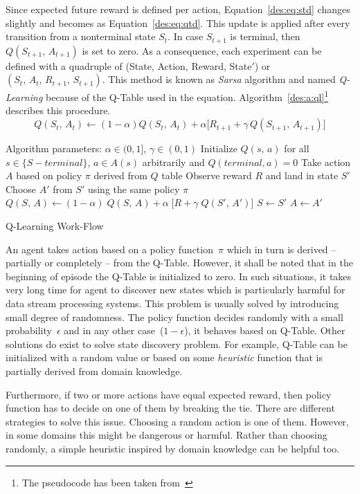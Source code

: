 Since expected future reward is defined per action, Equation~\ref{des:eq:std} changes slightly and becomes as Equation~\ref{des:eq:qtd}. This update is applied after every transition from a nonterminal state $S_t$. In case $S_{t+1}$ is terminal, then $Q(S_{t+1},\,A_{t+1})$ is set to zero. As a consequence, each experiment can be defined with a quadruple of (State, Action, Reward, State$'$) or $(S_{t},\,A_{t},\,R_{t+1},\,S_{t+1})$. This method is known as \emph{Sarsa} algorithm and named \emph{Q-Learning} because of the Q-Table used in the equation. Algorithm~\ref{des:a:ql}\footnote{The pseudocode has been taken from~\textcite{rlIntro}} describes this procedure.
\begin{equation}
Q(S_t,\,A_t) \longleftarrow (1-\alpha)Q(S_t,\,A_t) + \alpha\big[R_{t+1} + \gamma\,Q(S_{t+1},\,A_{t+1})\big]
\label{des:eq:qtd}
\end{equation}
\begin{algorithm}[t]
	\DontPrintSemicolon
	
	Algorithm parameters: $\alpha \in (0,1]$, $\gamma \in (0,1)$\;
	Initialize $Q(s,\,a)$ for all $s \in \{S - terminal\}$, $a \in A(s)$ arbitrarily and $Q(terminal,a) = 0$\;
	\BlankLine
	 {
		Take action $A$ based on policy $\pi$ derived from $Q$ table\;
		Observe reward $R$ and land in state $S'$\;
		Choose $A'$ from $S'$ using the same policy $\pi$\;
		$Q(S,\,A) \gets (1-\alpha)\;Q(S,\,A) + \alpha\;\big[R + \gamma\;Q(S',\,A')\big]$\;
		$S \gets S'$\;
		$A \gets A'$\;
	}
	\caption{Q-Learning Work-Flow}
	\label{des:a:ql}
\end{algorithm}

An agent takes action based on a policy function~$\pi$ which in turn is derived -- partially or completely -- from the Q-Table. However, it shall be noted that in the beginning of episode the Q-Table is initialized to zero. In such situations, it takes very long time for agent to discover new states which is particularly harmful for data stream processing systems. This problem is usually solved by introducing small degree of randomness. The policy function decides randomly with a small probability~$\epsilon$ and in any other case~($1-\epsilon$), it behaves based on Q-Table. Other solutions do exist to solve state discovery problem. For example, Q-Table can be initialized with a random value or based on some \emph{heuristic} function that is partially derived from domain knowledge. 

Furthermore, if two or more actions have equal expected reward, then policy function has to decide on one of them by breaking the tie. There are different strategies to solve this issue. Choosing a random action is one of them. However, in some domains this might be dangerous or harmful. Rather than choosing randomly, a simple heuristic inspired by domain knowledge can be helpful too.
